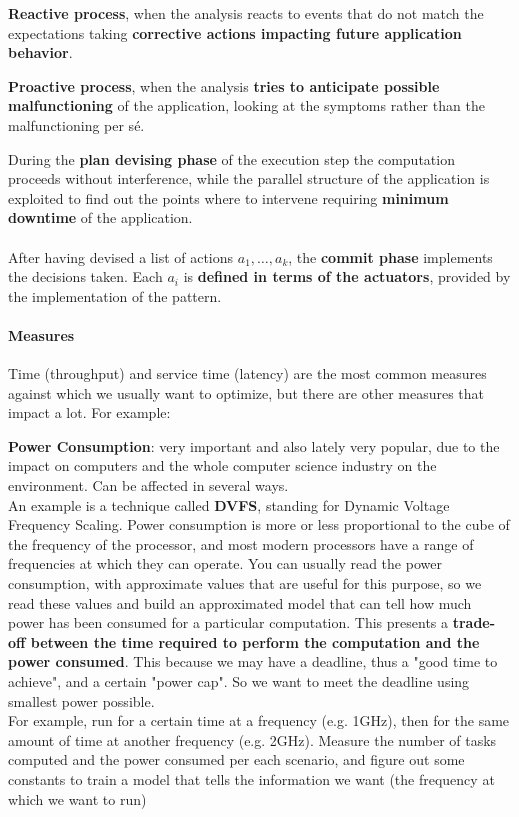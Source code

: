 \documentclass[10pt]{report}
\begin{document}
\begin{list}{}{}
	\item \textbf{Reactive process}, when the analysis reacts to events that do not match the expectations taking \textbf{corrective actions impacting future application behavior}.
	\item \textbf{Proactive process}, when the analysis \textbf{tries to anticipate possible malfunctioning} of the application, looking at the symptoms rather than the malfunctioning per sé.
\end{list}
During the \textbf{plan devising phase} of the execution step the computation proceeds without interference, while the parallel structure of the application is exploited to find out the points where to intervene requiring \textbf{minimum downtime} of the application.\\\\
After having devised a list of actions $a_1,\ldots,a_k$, the \textbf{commit phase} implements the decisions taken. Each $a_i$ is \textbf{defined in terms of the actuators}, provided by the implementation of the pattern.
\paragraph{Measures} Time (throughput) and service time (latency) are the most common measures against which we usually want to optimize, but there are other measures that impact a lot. For example:
\begin{list}{}{}
	\item \textbf{Power Consumption}: very important and also lately very popular, due to the impact on computers and the whole computer science industry on the environment. Can be affected in several ways.\\
	An example is a technique called \textbf{DVFS}, standing for Dynamic Voltage Frequency Scaling. Power consumption is more or less proportional to the cube of the frequency of the processor, and most modern processors have a range of frequencies at which they can operate. You can usually read the power consumption, with approximate values that are useful for this purpose, so we read these values and build an approximated model that can tell how much power has been consumed for a particular computation. This presents a \textbf{trade-off between the time required to perform the computation and the power consumed}. This because we may have a deadline, thus a "good time to achieve", and a certain "power cap". So we want to meet the deadline using smallest power possible.\\
	For example, run for a certain time at a frequency (e.g. 1GHz), then for the same amount of time at another frequency (e.g. 2GHz). Measure the number of tasks computed and the power consumed per each scenario, and figure out some constants to train a model that tells the information we want (the frequency at which we want to run)
\end{list}
\end{document}
